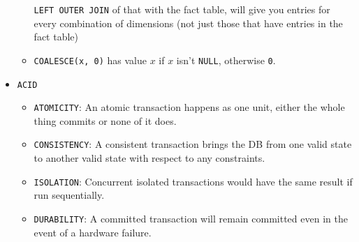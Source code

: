 \documentclass[landscape,8pt]{extarticle}
\newcommand{\code}{\lstinline}
\begin{document}
\begin{multicols}{4}
\begin{itemize}
\begin{itemize}
    \code{LEFT OUTER JOIN} of that with the fact table, will give you entries for every combination of dimensions
    (not just those that have entries in the fact table)
    \item \code{COALESCE(x, 0)} has value $x$ if $x$ isn't \code{NULL}, otherwise \code{0}.
    \end{itemize}
    \item \code{ACID}
    \begin{itemize}
        \item \code{ATOMICITY}: An atomic transaction happens as one unit, either the whole thing
        commits or none of it does.
        \item \code{CONSISTENCY}: A consistent transaction brings the DB from one valid state to
        another valid state with respect to any constraints.
        \item \code{ISOLATION}: Concurrent isolated transactions would have the same result if run sequentially.
        \item \code{DURABILITY}: A committed transaction will remain committed even in the event of
        a hardware failure.
    \end{itemize}
\end{itemize}
    \end{multicols}
\end{document}
